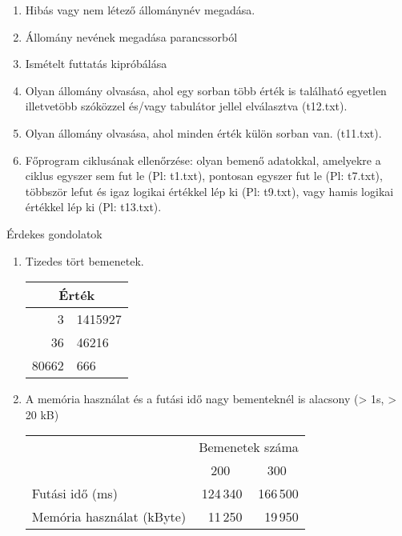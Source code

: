 \documentclass[12pt,a4paper]{article}			%
\begin{document}
		\renewcommand{\labelenumi}{\arabic{enumi}.}
		 \vspace{2mm}
		\begin{enumerate}[1, itemsep=0ex]
			\item Hibás vagy nem létező állománynév megadása.
			\item Állomány nevének megadása parancssorból
			\item Ismételt futtatás kipróbálása
			\item Olyan állomány olvasása, ahol egy sorban több érték is található egyetlen illetvetöbb szóközzel és/vagy tabulátor jellel elválasztva (t12.txt).
			\item Olyan állomány olvasása, ahol minden érték külön sorban van. (t11.txt).
			\item Főprogram ciklusának ellenőrzése: olyan bemenő adatokkal, amelyekre a ciklus egyszer sem fut le (Pl: t1.txt), pontosan egyszer fut le (Pl: t7.txt), többször lefut és igaz logikai értékkel lép ki (Pl: t9.txt), vagy hamis logikai értékkel lép ki (Pl: t13.txt).
		\end{enumerate}
		{\large Érdekes gondolatok} \vspace{2mm}
		\begin{enumerate}[1, itemsep=0ex]
			\item Tizedes tört bemenetek.
			\begin{table}[htb]
				\center
				\begin{tabular}{r@{,}l}
					\multicolumn{2}{c}{Érték} \\
					\hline
					3&1415927 \\
					36&46216 \\
					80662&666
				\end{tabular}
			\end{table}
			\item A memória használat és a futási idő nagy bementeknél is alacsony (> 1s, > 20 kB)\\
			\begin{tabular}{@{}lrr@{}}
				\toprule
				&\multicolumn{2}{c}{Bemenetek száma}\\
				\cmidrule{2-3}
				& \multicolumn{1}{c}{200} &
				\multicolumn{1}{c}{300}\\
				\midrule
				Futási idő (ms) & 124\,340 & 166\,500\\
				Memória használat (kByte) & 11\,250 & 19\,950\\
				\bottomrule
			\end{tabular}
		\end{enumerate}
\end{document}
